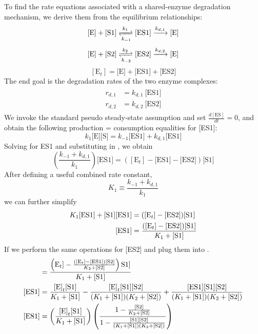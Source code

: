To find the rate equations associated with a shared-enzyme degradation mechanism, we derive them from the equilibrium relationships:
\begin{equation*}
  \text{[E]} + \text{[S1]} \xrightleftharpoons[k_{-1}]{k_1} \text{[ES1]} \xrightarrow{k_{d,1}} \text{[E]}
\end{equation*}
\begin{equation*}
  \text{[E]} + \text{[S2]} \xrightleftharpoons[k_{-2}]{k_2}  \text{[ES2]} \xrightarrow{k_{d,2}} \text{[E]}
\end{equation*}
\begin{equation} \label{eq:totE}
  [\text{E}_t] = \text{[E]} + \text{[ES1]} + \text{[ES2]}
\end{equation}
The end goal is the degradation rates of the two enzyme complexes:
\begin{align}
  \begin{split}\label{eq:r1}
    r_{d,1} &= k_{d,1} \ \text{[ES1]}\\
    r_{d,2} &= k_{d,2} \ \text{[ES2]}
  \end{split}
\end{align}
We invoke the standard pseudo steady-state assumption and set $\frac{d[\text{ES}]}{dt}=0$, and obtain the following production = consumption equalities for [ES1]:
\begin{equation} \label{eq:pss}
  k_1\text{[E]}\text{[S]} = k_{-1}\text{[ES1]} + k_{d,1}\text{[ES1]}
\end{equation}
Solving  for ES1 and substituting in , we obtain
\begin{equation*}
  \left(\frac{k_{-1}+k_{d,1}}{k_1}\right)\text{[ES1]} = \left([\text{E}_t] - \text{[ES1]} - \text{[ES2]}\right)\text{[S1]}
\end{equation*}
After defining a useful combined rate constant,
\begin{equation*}
  K_1 \equiv \frac{k_{-1}+k_{d,1}}{k_1}
\end{equation*}
we can further simplify
\begin{align}
  K_1 \text{[ES1]} + \text{[S1]}\text{[ES1]} &= ([\text{E}_t] - [\text{ES2}])[\text{S1}] \notag\\
  [\text{ES1}] &= \frac{([\text{E}_t] - [\text{ES2}])[\text{S1}]}{K_1 + [\text{S1}]} \label{eq:eqabove}
\end{align}
If we perform the same operations for [ES2] and plug them into .
\begin{align}
  [\text{ES1}] &= \frac{\left(\text{E}_t] - \frac{([\text{E}_t] - [\text{ES1}])[\text{S2}]}{K_2 + [\text{S2}]}\right)\text{S1}]}{K_1 + [\text{S1}]} \notag\\
  [\text{ES1}] &= \frac{\text{[E]}_t \text{[S1]}}{K_1 + \text{[S1]}} - \frac{\text{[E]}_t \text{[S1]} \text{[S2]}}{(K_1 + \text{[S1]}) (K_2 + \text{[S2]})} + \frac{\text{[ES1]} \text{[S1]} \text{[S2]}}{(K_1 + \text{[S1]}) (K_2 + \text{[S2]})} \notag\\
  \label{eq:twofracs}
  [\text{ES1}] &= \left(\frac{\text{[E]}_t \text{[S1]}}{K_1 + \text{[S1]}}\right) \left(\frac{1 - \frac{\text{[S2]}}{K_2 + \text{[S2]}}}{1 - \frac{\text{[S1]} \text{[S2]}}{(K_1 + \text{[S1]}) (K_2 + \text{[S2]})}}\right)
\end{align}

